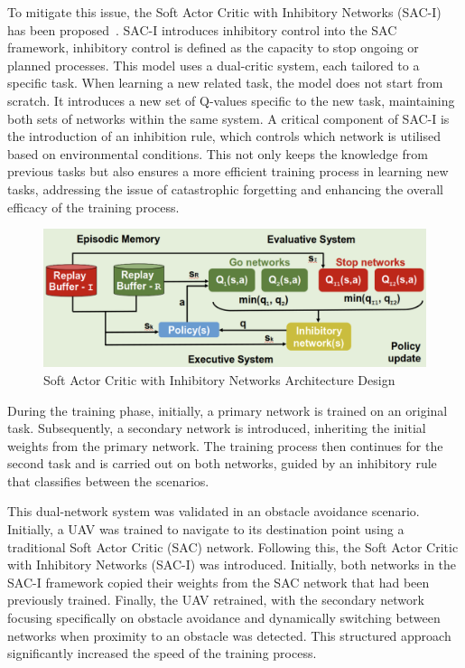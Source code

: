 To mitigate this issue, the Soft Actor Critic with Inhibitory Networks (SAC-I) has been proposed~\cite{fyp10-sac-Inhibitory}.
SAC-I introduces inhibitory control into the SAC framework, inhibitory control is defined as the capacity to stop ongoing or planned processes.
This model uses a dual-critic system, each tailored to a specific task.
When learning a new related task, the model does not start from scratch.
It introduces a new set of Q-values specific to the new task, maintaining both sets of networks within the same system. 
A critical component of SAC-I is the introduction of an inhibition rule, which controls which network is utilised based on environmental conditions.
This not only keeps the knowledge from previous tasks but also ensures a more efficient training process in learning new tasks, addressing the issue of catastrophic forgetting and enhancing the overall efficacy of the training process.

\begin{figure}[htbp]
  \centering
  \includegraphics[width=\textwidth]{background/fyp-10-sac-inhibitors.png}
  \caption{Soft Actor Critic with Inhibitory Networks Architecture Design}
\label{fig:fyp17-sacfd}
\end{figure}

During the training phase, initially, a primary network is trained on an original task.
Subsequently, a secondary network is introduced, inheriting the initial weights from the primary network.
The training process then continues for the second task and is carried out on both networks, guided by an inhibitory rule that classifies between the scenarios.

This dual-network system was validated in an obstacle avoidance scenario.
Initially, a UAV was trained to navigate to its destination point using a traditional Soft Actor Critic (SAC) network. 
Following this, the Soft Actor Critic with Inhibitory Networks (SAC-I) was introduced. 
Initially, both networks in the SAC-I framework copied their weights from the SAC network that had been previously trained. 
Finally, the UAV retrained, with the secondary network focusing specifically on obstacle avoidance and dynamically switching between networks when proximity to an obstacle was detected. 
This structured approach significantly increased the speed of the training process.


